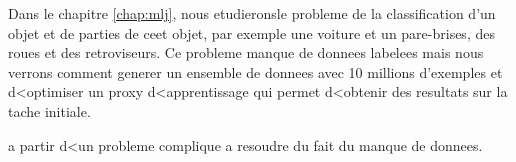 Dans le chapitre \ref{chap:mlj}, nous etudieronsle probleme de la
classification d'un objet et de parties de ceet objet, par exemple une voiture
et un pare-brises, des roues et des retroviseurs. Ce probleme manque de
donnees labelees mais nous verrons comment generer un ensemble de donnees avec
10 millions d'exemples et d<optimiser un proxy d<apprentissage qui permet d<obtenir des resultats sur la tache initiale.  

a partir d<un probleme
complique a resoudre du fait du manque de donnees. 
